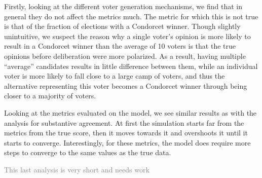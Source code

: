 Firstly, looking at the different voter generation mechanisms, we find that in
general they do not affect the metrics much. The metric for which this is not
true is that of the fraction of elections with a Condorcet winner. Though
slightly unintuitive, we suspect the reason why a single voter's opinion is
more likely to result in a Condorcet winner than the average of 10 voters is
that the true opinions before deliberation were more polarized. As a result,
having multiple ``average'' candidates results in little difference between
them, while an individual voter is more likely to fall close to a large camp of
voters, and thus the alternative representing this voter becomes a Condorcet
winner through being closer to a majority of voters.

Looking at the metrics evaluated on the model, we see similar results as with
the analysis for substantive agreement. At first the simulation starts far from
the metrics from the true score, then it moves towards it and overshoots it
until it starts to converge. Interestingly, for these metrics, the model does require more steps to converge to the same values as the true data.

\textcolor{gray}{This last analysis is very short and needs work}
